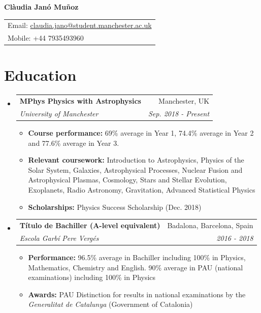 \documentclass[letterpaper,11pt]{article}
\makeatletter
\newcommand{\resumeItem}[2]{
  \item\small{
    \textbf{#1}{ #2 \vspace{-2pt}}
  }
}
\newcommand{\resumeSubheading}[4]{
  \vspace{-1pt}\item
    \begin{tabular*}{0.97\textwidth}[t]{l@{\extracolsep{\fill}}r}
      \textbf{#1} & #2 \\
      \textit{\small#3} & \textit{\small #4} \\
    \end{tabular*}\vspace{-5pt}
}
\newcommand{\resumeSubHeadingListStart}{\begin{itemize}[leftmargin=*]}
\newcommand{\resumeSubHeadingListEnd}{\end{itemize}}
\newcommand{\resumeItemListStart}{\begin{itemize}}
\newcommand{\resumeItemListEnd}{\end{itemize}\vspace{-5pt}}
\makeatother
\begin{document}
\begin{center}
\textbf{\Huge Clàudia Janó Muñoz}\\
\end{center}
\begin{tabular*}{\textwidth}{l}
Email: \href{mailto:claudia.jano@student.manchester.ac.uk}{claudia.jano@student.manchester.ac.uk}\\
Mobile: +44 7935493960\\
\end{tabular*}


\section{Education}
  \resumeSubHeadingListStart
    \resumeSubheading
      {MPhys Physics with Astrophysics}{Manchester, UK}{University of Manchester}{Sep. 2018 - Present}
        \resumeItemListStart
            \resumeItem{Course performance:}
                {69\% average in Year 1, 74.4\% average in Year 2 and 77.6\% average in Year 3.}
            \resumeItem{Relevant coursework:}
                {Introduction to Astrophysics, Physics of the Solar System, Galaxies, Astrophysical Processes, Nuclear Fusion and Astrophysical Plasmas, Cosmology, Stars and Stellar Evolution, Exoplanets, Radio Astronomy, Gravitation, Advanced Statistical Physics}
            \resumeItem{Scholarships:}
                {Physics Success Scholarship (Dec. 2018)}
        \resumeItemListEnd
    \resumeSubheading
      {Título de Bachiller (A-level equivalent)}{Badalona, Barcelona, Spain}
      {Escola Garbí Pere Vergés}{2016 - 2018}
      \resumeItemListStart
        \resumeItem {Performance:}
        {96.5\% average in Bachiller including 100\% in Physics, Mathematics, Chemistry and English. 90\% average in PAU (national examinations) including 100\% in Physics}
        \resumeItem {Awards:}
        {PAU Distinction for results in national examinations by the \textit{Generalitat de Catalunya} (Government of Catalonia) }
       \resumeItemListEnd
  \resumeSubHeadingListEnd

\end{document}
